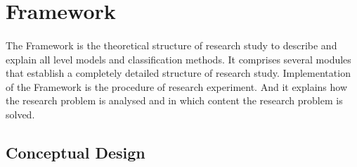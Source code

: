\documentclass[runningheads]{llncs}
\begin{document}
\paragraph{}
%
%
%
%
%
%
%
%
%
%
%
%
%
%
%
%
%
%
%
%
\pagebreak
\section{Framework}
%
\paragraph{}
The Framework is the theoretical structure of research study to describe and explain all level models and classification methods. It comprises several modules that establish a completely detailed structure of research study. Implementation of the Framework is the procedure of research experiment. And it explains how the research problem is analysed and in which content the research problem is solved. 
%
\subsection{Conceptual Design}
%
\end{document}
